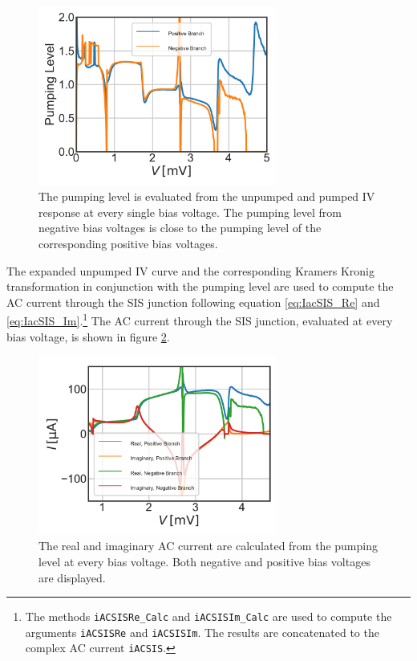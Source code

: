 \documentclass[]{article}
\begin{document}
\begin{figure}
	\centering
	\includegraphics[width=0.7\textwidth]{./../Mixer_Unit_Test/2020_01_12_FixedMask/Pumping_Level.pdf}
	\caption{The pumping level is evaluated from the unpumped and pumped IV response at every single bias voltage. The pumping level from negative bias voltages is close to the pumping level of the corresponding positive bias voltages.}
	\label{fig:Pumping_Level}
\end{figure}

The expanded unpumped IV curve and the corresponding Kramers Kronig transformation in conjunction with the pumping level are used to compute the AC current through the SIS junction following equation \ref{eq:IacSIS_Re} and \ref{eq:IacSIS_Im}.\footnote{The methods \texttt{iACSISRe\_Calc} and \texttt{iACSISIm\_Calc} are used to compute the arguments \texttt{iACSISRe} and \texttt{iACSISIm}. The results are concatenated to the complex AC current \texttt{iACSIS}.} The AC current  through the SIS junction, evaluated at every bias voltage, is shown in figure \ref{fig:iACSIS}.

\begin{figure}
	\centering
	\includegraphics[width=0.7\textwidth]{./../Mixer_Unit_Test/2020_01_12_FixedMask/Current_through_Junction.pdf}
	\caption{The real and imaginary AC current are calculated from the pumping level at every bias voltage. Both negative and positive bias voltages are displayed.}
	\label{fig:iACSIS}
\end{figure}
\end{document}
